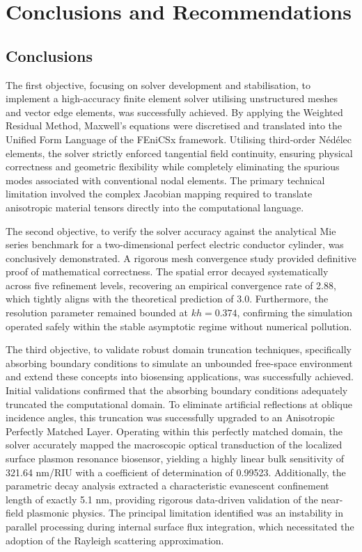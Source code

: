 \documentclass[class=report, crop=false]{standalone}
\begin{document}
\chapter{Conclusions and Recommendations}

\section{Conclusions}

The first objective, focusing on solver development and stabilisation, to implement a high-accuracy finite element solver utilising unstructured meshes and vector edge elements, was successfully achieved. By applying the Weighted Residual Method, Maxwell's equations were discretised and translated into the Unified Form Language of the FEniCSx framework. Utilising third-order N\'{e}d\'{e}lec elements, the solver strictly enforced tangential field continuity, ensuring physical correctness and geometric flexibility while completely eliminating the spurious modes associated with conventional nodal elements. The primary technical limitation involved the complex Jacobian mapping required to translate anisotropic material tensors directly into the computational language.

\vspace{12pt}

The second objective, to verify the solver accuracy against the analytical Mie series benchmark for a two-dimensional perfect electric conductor cylinder, was conclusively demonstrated. A rigorous mesh convergence study provided definitive proof of mathematical correctness. The spatial error decayed systematically across five refinement levels, recovering an empirical convergence rate of 2.88, which tightly aligns with the theoretical prediction of 3.0. Furthermore, the resolution parameter remained bounded at $kh = 0.374$, confirming the simulation operated safely within the stable asymptotic regime without numerical pollution.

\vspace{12pt}

The third objective, to validate robust domain truncation techniques, specifically absorbing boundary conditions to simulate an unbounded free-space environment and extend these concepts into biosensing applications, was successfully achieved. Initial validations confirmed that the absorbing boundary conditions adequately truncated the computational domain. To eliminate artificial reflections at oblique incidence angles, this truncation was successfully upgraded to an Anisotropic Perfectly Matched Layer. Operating within this perfectly matched domain, the solver accurately mapped the macroscopic optical transduction of the localized surface plasmon resonance biosensor, yielding a highly linear bulk sensitivity of 321.64 nm/RIU with a coefficient of determination of 0.99523. Additionally, the parametric decay analysis extracted a characteristic evanescent confinement length of exactly 5.1 nm, providing rigorous data-driven validation of the near-field plasmonic physics. The principal limitation identified was an instability in parallel processing during internal surface flux integration, which necessitated the adoption of the Rayleigh scattering approximation.
\end{document}
